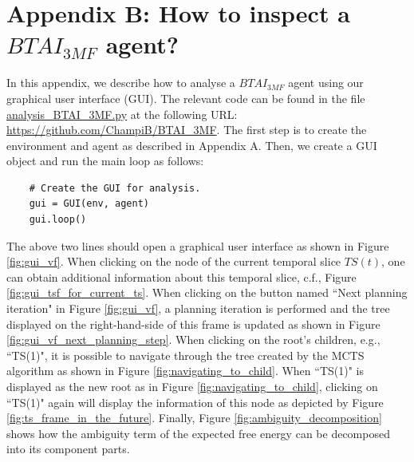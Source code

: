 \documentclass[twoside,11pt]{article}
\begin{document}
\section*{Appendix B: How to inspect a $BTAI_{3MF}$ agent?}

In this appendix, we describe how to analyse a $BTAI_{3MF}$ agent using our graphical user interface (GUI). The relevant code can be found in the file \url{analysis_BTAI_3MF.py} at the following URL: \url{https://github.com/ChampiB/BTAI_3MF}. The first step is to create the environment and agent as described in Appendix A. Then, we create a GUI object and run the main loop as follows:
\begin{verbatim}
    # Create the GUI for analysis.
    gui = GUI(env, agent)
    gui.loop()
\end{verbatim}
The above two lines should open a graphical user interface as shown in Figure \ref{fig:gui_vf}. When clicking on the node of the current temporal slice $TS(t)$, one can obtain additional information about this temporal slice, c.f., Figure \ref{fig:gui_tsf_for_current_ts}. When clicking on the button named ``Next planning iteration" in Figure \ref{fig:gui_vf}, a planning iteration is performed and the tree displayed on the right-hand-side of this frame is updated as shown in Figure \ref{fig:gui_vf_next_planning_step}. When clicking on the root's children, e.g., ``TS(1)", it is possible to navigate through the tree created by the MCTS algorithm as shown in Figure \ref{fig:navigating_to_child}. When ``TS(1)" is displayed as the new root as in Figure \ref{fig:navigating_to_child}, clicking on ``TS(1)" again will display the information of this node as depicted by Figure \ref{fig:ts_frame_in_the_future}. Finally, Figure \ref{fig:ambiguity_decomposition} shows how the ambiguity term of the expected free energy can be decomposed into its component parts.
\end{document}
